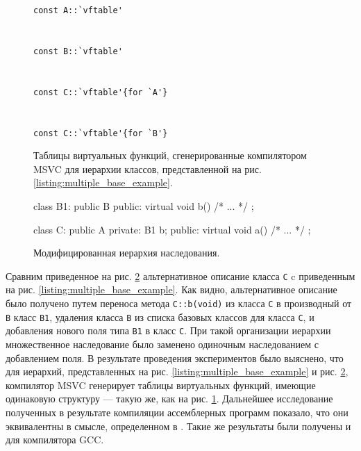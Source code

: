 \begin{figure}[htb!]
\hspace{2cm}
\begin{minipage}[b]{1cm}
\lstinline!const A::`vftable'! \\
 \\
\\
\lstinline!const B::`vftable'! \\
 \\
\\
\lstinline!const C::`vftable'{for `A'}! \\
 \\
\\
\lstinline!const C::`vftable'{for `B'}! \\
\end{minipage}
\caption{Таблицы виртуальных функций, сгенерированные компилятором MSVC для иерархии классов, представленной на рис. \ref{listing:multiple_base_example}.}
\label{fig:multiple_base_example_vtable}
\end{figure}

\begin{figure}[htb!]
\hspace{2cm}
\begin{minipage}[b]{1cm}
\begin{cplusplus}
class B1: public B {
public:
    virtual void b() {/* ... */}
};

class C: public A {
private:
    B1 b;
public:
    virtual void a() {/* ... */}
};
\end{cplusplus}
\end{minipage}
\caption{Модифицированная иерархия наследования.}
\label{listing:multiple_base_example_modified}
\end{figure}

Сравним приведенное на рис. \ref{listing:multiple_base_example_modified} альтернативное описание класса \lstinline{C} c приведенным на рис. \ref{listing:multiple_base_example}. Как видно, альтернативное описание было получено путем переноса метода \lstinline{C::b(void)} из класса \lstinline{C} в производный от \lstinline{B} класс \lstinline{B1}, удаления класса \lstinline{B} из списка базовых классов для класса \lstinline{C}, и добавления нового поля типа \lstinline{B1} в класс \lstinline{C}. При такой организации иерархии множественное наследование было заменено одиночным наследованием с добавлением поля. В результате проведения экспериментов было выяснено, что для иерархий, представленных на рис. \ref{listing:multiple_base_example} и рис. \ref{listing:multiple_base_example_modified}, компилятор MSVC генерирует таблицы виртуальных функций, имеющие одинаковую структуру --- такую же, как на рис. \ref{fig:multiple_base_example_vtable}. Дальнейшее исследование полученных в результате компиляции ассемблерных программ показало, что они эквивалентны в смысле, определенном в \cite{dolgova08}. Такие же результаты были получены и для компилятора GCC.

